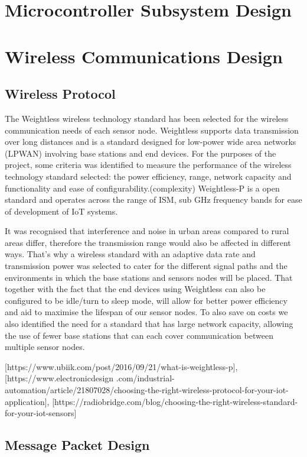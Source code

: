 \documentclass[12pt]{article}
\begin{document}
\section{Microcontroller Subsystem Design}

\section{Wireless Communications Design}

\subsection{Wireless Protocol}

The Weightless wireless technology standard has been selected for the wireless communication needs of each sensor node. Weightless supports data transmission over long distances and is a standard designed for low-power wide area networks (LPWAN) involving base stations and end devices. For the purposes of the project, some criteria was identified to measure the performance of the wireless technology standard selected: the power efficiency, range, network capacity and  functionality and ease of configurability.(complexity) Weightless-P is a open standard and operates across the range of ISM, sub GHz  frequency bands for ease of development of IoT systems. 

It was recognised that interference and noise in urban areas compared to rural areas differ, therefore the transmission range would also be affected in different ways. That's why a wireless standard with an adaptive data rate and transmission power was selected to cater for the different signal paths and the environments in which the base stations and sensors nodes will be placed. That together with the fact that the end devices using Weightless can also be configured to be idle/turn to sleep mode, will allow for better power efficiency and aid to maximise the lifespan of our sensor nodes. 
To also save on costs we also identified the need for a standard that has large network capacity, allowing the use of fewer base stations that can each cover communication between multiple sensor nodes.

[https://www.ubiik.com/post/2016/09/21/what-is-weightless-p], [https://www.electronicdesign
.com/industrial-automation/article/21807028/choosing-the-right-wireless-protocol-for-your-iot-application], [https://radiobridge.com/blog/choosing-the-right-wireless-standard-for-your-iot-sensors]

\subsection{Message Packet Design}
\end{document}
